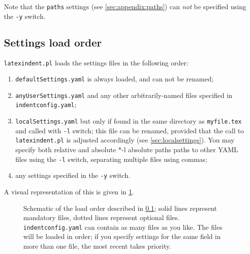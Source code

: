  Note that the \texttt{paths} settings (see \vref{sec:appendix:paths}) can \emph{not} be
 specified using the \texttt{-y} switch.

\subsection{Settings load order}\label{sec:loadorder}
 \texttt{latexindent.pl} loads the settings files in the following order:
 \begin{enumerate}
  \item \texttt{defaultSettings.yaml} is always loaded, and can not be renamed;
  \item \texttt{anyUserSettings.yaml} and any other arbitrarily-named files specified in
        \texttt{indentconfig.yaml};
  \item \texttt{localSettings.yaml} but only if found in the same directory as
        \texttt{myfile.tex}
        and called with \texttt{-l} switch; this file can be renamed, provided that the call to
        \texttt{latexindent.pl} is adjusted accordingly (see \cref{sec:localsettings}). You may
        specify both relative and absolute%
        *{-l absolute paths} paths to other YAML files using the \texttt{-l}
        switch, separating multiple files using commas;
  \item any settings  specified in the
        \texttt{-y} switch.%
 \end{enumerate}
 A visual representation of this is given in \cref{fig:loadorder}.

 \begin{figure}[!htb]
  \centering
  
  \caption{Schematic of the load order described in \cref{sec:loadorder}; solid lines represent
  mandatory files, dotted lines represent optional files. \texttt{indentconfig.yaml} can
  contain as many files as you like. The files will be loaded in order; if you specify
  settings for the same field in more than one file, the most recent takes priority. }
  \label{fig:loadorder}
 \end{figure}

